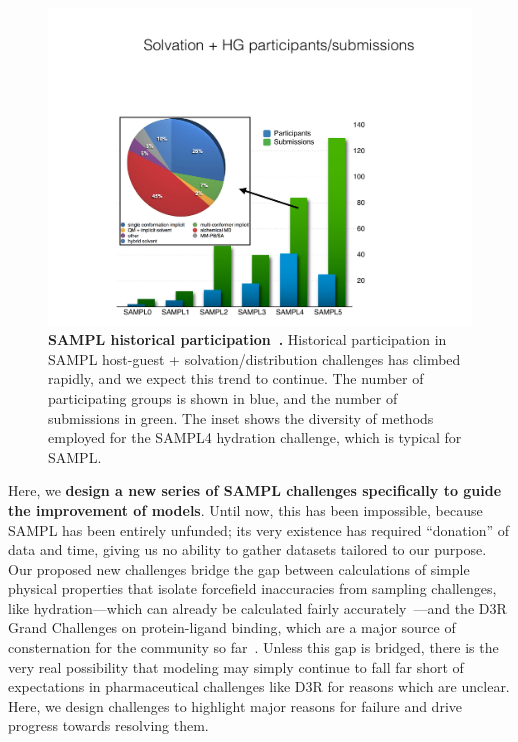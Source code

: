 \documentclass[11pt]{article}
\begin{document}
\begin{figure}
\vspace{-0.15in}
\begin{centering}
\includegraphics[width=\textwidth]{figures/history_v1.pdf}

\end{centering}
\footnotesize
\caption{\label{figure:sampl5_logD}  
\textbf{SAMPL historical participation~\cite{mobley_blind_2014-1}.} 
Historical participation in SAMPL host-guest + solvation/distribution challenges has climbed rapidly, and we expect this trend to continue. The number of participating groups is shown in blue, and the number of submissions in green. The inset shows the diversity of methods employed for the SAMPL4 hydration challenge, which is typical for SAMPL. 
}
\end{figure}

Here, we \textbf{design a new series of SAMPL challenges specifically to guide the improvement of models}.
Until now, this has been impossible, because SAMPL has been entirely unfunded; its very existence has required ``donation'' of data and time, giving us no ability to gather datasets tailored to our purpose. 
Our proposed new challenges bridge the gap between calculations of simple physical properties that isolate forcefield inaccuracies from sampling challenges, like hydration---which can already be calculated fairly accurately~\cite{mobley_blind_2014-1}---and the D3R Grand Challenges on protein-ligand binding, which are a major source of consternation for the community so far~\cite{ignjatovic_binding-affinity_2016, deng_large_2016, sunseri_d3r_2016, gathiaka_d3r_2016}.
Unless this gap is bridged, there is the very real possibility that modeling may simply continue to fall far short of expectations in pharmaceutical challenges like D3R for reasons which are unclear.
Here, we design challenges to highlight major reasons for failure and drive progress towards resolving them.
\end{document}
